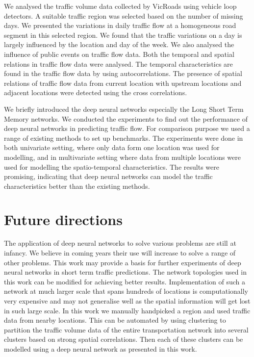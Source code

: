 We analysed the traffic volume data collected by VicRoads using vehicle loop detectors. A suitable
traffic region was selected based on the number of missing days. We presented the
variations in daily traffic flow at a homogeneous road segment in this selected region. We found
that the traffic variations on a day is largely influenced by the location and day of the week.
We also analysed the influence of public events on traffic flow data. Both the temporal and
spatial relations in traffic flow data were analysed. The temporal characteristics are found in the
traffic flow data by using autocorrelations. The presence of spatial relations of traffic flow
data from current location with upstream locations and adjacent locations were detected using the
cross correlations.

We briefly introduced the deep neural networks especially the Long Short Term Memory networks.
We conducted the experiments to find out the performance of deep neural networks in predicting traffic
flow. For comparison purpose we used a range of existing methods to set up benchmarks. The experiments
were done in both univariate setting, where only data form one location was used for modelling, and
in multivariate setting where data from multiple locations were used for modelling the spatio-temporal
characteristics. The results were promising, indicating that deep neural networks can model
the traffic characteristics better than the existing methods.

\section{Future directions}
The application of deep neural networks to solve various problems are still at infancy. We believe in
coming years their use will increase to solve a range of other problems. This work may provide a basis
for further experiments of deep neural networks in short term traffic predictions. The network topologies
used in this work can be modified for achieving better results. Implementation of such a network at much
larger scale that spans hundreds of locations is computationally very expensive and may not generalise
well as the spatial information will get lost in such large scale. In this work we manually handpicked
a region and used traffic data from nearby locations. This can be automated by using clustering
to partition the traffic volume data of the entire transportation network into several clusters
based on strong spatial correlations. Then each of these clusters can be modelled using a deep
neural network as presented in this work.
